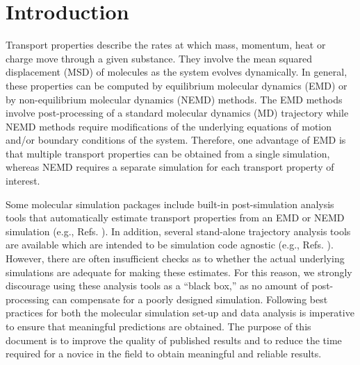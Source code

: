 \documentclass[9pt,bestpractices]{livecoms}
\begin{document}
\section{Introduction}

Transport properties describe the rates at which mass, momentum, heat or charge move through a given substance. They involve the mean squared displacement (MSD) of molecules as the system evolves dynamically. In general, these properties can be computed by equilibrium molecular dynamics (EMD) or by non-equilibrium molecular dynamics (NEMD) methods. The EMD methods involve post-processing of a standard molecular dynamics (MD) trajectory while NEMD methods require modifications of the underlying equations of motion and/or boundary conditions of the system. Therefore, one advantage of EMD is that multiple transport properties can be obtained from a single simulation, whereas NEMD requires a separate simulation for each transport property of interest.

Some molecular simulation packages include built-in post-simulation analysis tools that automatically estimate transport properties from an EMD or NEMD simulation (e.g., Refs. \cite{LAMMPS,GROMACS,AMBER2018,NAMD,Brooks2009,ms2}). In addition, several stand-alone trajectory analysis tools are available which are intended to be simulation code agnostic (e.g., Refs. \cite{Roe2013,MDTraj,VMD}). However, there are often insufficient checks as to whether the actual underlying simulations are adequate for making these estimates. For this reason, we strongly discourage using these analysis tools as a ``black box,'' as no amount of post-processing can compensate for a poorly designed simulation. Following best practices for both the molecular simulation set-up and data analysis is imperative to ensure that meaningful predictions are obtained. The purpose of this document is to improve the quality of published results and to reduce the time required for a novice in the field to obtain meaningful and reliable results.
\end{document}
